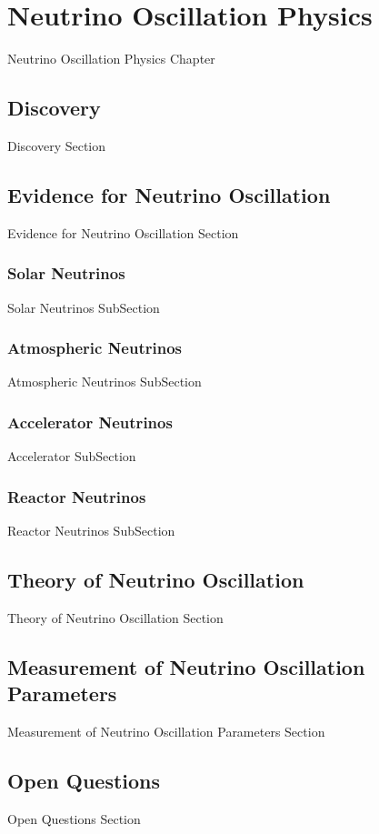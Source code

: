 \chapter{Neutrino Oscillation Physics}
\label{chap:NeutrinoOscillationPhysics}
Neutrino Oscillation Physics Chapter

\section{Discovery}
\label{sec:NeutrinoOscillationPhysics_Discovery}
Discovery Section

\section{Evidence for Neutrino Oscillation}
\label{sec:NeutrinoOscillationPhysics_EvidenceForNeutrinoOscillation}
Evidence for Neutrino Oscillation Section

\subsection{Solar Neutrinos}
\label{subsec:NeutrinoOscillationPhysics_SolarNeutrinos}
Solar Neutrinos SubSection

\subsection{Atmospheric Neutrinos}
\label{subsec:NeutrinoOscillationPhysics_AtmosphericNeutrinos}
Atmospheric Neutrinos SubSection

\subsection{Accelerator Neutrinos}
\label{subsec:NeutrinoOscillationPhysics_AcceleratorNeutrinos}
Accelerator SubSection

\subsection{Reactor Neutrinos}
\label{subsec:NeutrinoOscillationPhysics_ReactorNeutrinos}
Reactor Neutrinos SubSection

\section{Theory of Neutrino Oscillation}
\label{sec:NeutrinoOscillationPhysics_TheoryOfNeutrinoOscillation}
Theory of Neutrino Oscillation Section

\section{Measurement of Neutrino Oscillation Parameters}
\label{sec:NeutrinoOscillationPhysics_MeasurementOfNeutrinoOscillationParameters}
Measurement of Neutrino Oscillation Parameters Section

\section{Open Questions}
\label{sec:NeutrinoOscillationPhysics_OpenQuestions}
Open Questions Section
